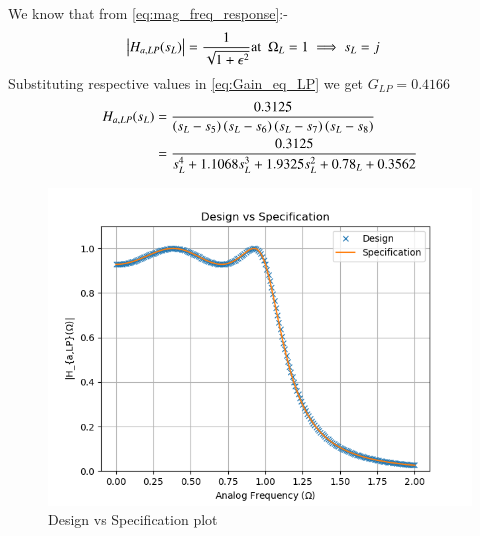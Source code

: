 \documentclass{article}
\begin{document}
\begin{enumerate}
We know that from \eqref{eq:mag_freq_response}:-
\begin{align}
    \left\vert H_{a,LP}(s_L)\right\vert &= \frac{1}{\sqrt{1+\epsilon^2}} \text{at} \hspace{5pt} \Omega_{L}=1 \implies s_{L} = j \label{eq:Gain_eq_LP} 
\end{align}
Substituting respective values in \eqref{eq:Gain_eq_LP} we get $G_{LP}=0.4166$
\begin{align}
     H_{a,LP}(s_L) &= \frac{0.3125}{\left(s_L-s_5\right)\left(s_L-s_6\right)\left(s_L-s_7\right)\left(s_L-s_8\right)}\\
     &= \frac{0.3125}{s_{L}^4 + 1.1068s_{L}^3 +1.9325s_{L}^2 + 0.78_{L} +0.3562}\label{eq:lpfinal}
\end{align}
\begin{figure}[H]
\centering
\includegraphics[width=1\columnwidth]{figs/des_spec.png}
\caption{Design vs Specification plot}
\label{fig:design_vs_spec}
\end{figure}





\end{enumerate}
\end{document}
